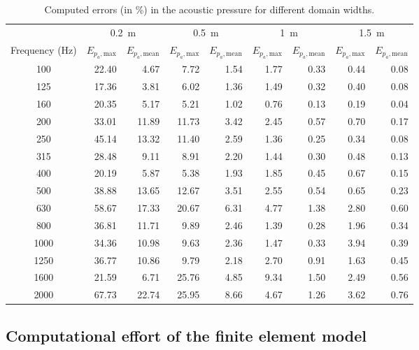 {\begin{table}
	\centering
	\caption{Computed errors (in \%) in the acoustic pressure for different domain widths.}
	\label{tab:computed_errors}
	\begin{tabular}{crrrrrrrr}
		\toprule
		 & \multicolumn{2}{c}{\SI{0.2}{\meter}} & \multicolumn{2}{c}{\SI{0.5}{\meter}} & \multicolumn{2}{c}{\SI{1}{\meter}} & \multicolumn{2}{c}{\SI{1.5}{\meter}} \\ \cmidrule(lr){2-3} \cmidrule(lr){4-5} \cmidrule(lr){6-7} \cmidrule(lr){8-9}
		 Frequency (Hz)& $E_{p_a,\text{max}}$  & $E_{p_a,\text{mean}}$ & $E_{p_a,\text{max}}$ & $E_{p_a,\text{mean}}$ & $E_{p_a,\text{max}}$ & $E_{p_a,\text{mean}}$ & $E_{p_a,\text{max}}$ & $E_{p_a,\text{mean}}$ \\
		 \midrule
		 100 & 22.40 & 4.67 & 7.72 & 1.54 & 1.77 & 0.33 & 0.44 & 0.08 \\ 
		 125 & 17.36 & 3.81 & 6.02 & 1.36 & 1.49 & 0.32 & 0.40 & 0.08 \\ 
		 160 & 20.35 & 5.17 & 5.21 & 1.02 & 0.76 & 0.13 & 0.19 & 0.04 \\ 
		 200 & 33.01 & 11.89 & 11.73 & 3.42 & 2.45 & 0.57 & 0.70 & 0.17 \\ 
		 250 & 45.14 & 13.32 & 11.40 & 2.59 & 1.36 & 0.25 & 0.34 & 0.08 \\ 
		 315 & 28.48 & 9.11 & 8.91 & 2.20 & 1.44 & 0.30 & 0.48 & 0.13 \\ 
		 400 & 20.19 & 5.87 & 5.38 & 1.93 & 1.85 & 0.45 & 0.67 & 0.15 \\ 
		 500 & 38.88 & 13.65 & 12.67 & 3.51 & 2.55 & 0.54 & 0.65 & 0.23 \\ 
		 630 & 58.67 & 17.33 & 20.67 & 6.31 & 4.77 & 1.38 & 2.80 & 0.60 \\ 
		 800 & 36.81 & 11.71 & 9.89 & 2.46 & 1.39 & 0.28 & 1.96 & 0.34 \\ 
		 1000 & 34.36 & 10.98 & 9.63 & 2.36 & 1.47 & 0.33 & 3.94 & 0.39 \\ 
		 1250 & 36.77 & 10.86 & 9.79 & 2.18 & 2.70 & 0.91 & 1.63 & 0.45 \\ 
		 1600 & 21.59 & 6.71 & 25.76 & 4.85 & 9.34 & 1.50 & 2.49 & 0.56 \\ 
		 2000 & 67.73 & 22.74 & 25.95 & 8.66 & 4.67 & 1.26 & 3.62 & 0.76 \\
		 \bottomrule		
	\end{tabular}
\end{table}


\newpage
\subsection*{Computational effort of the finite element model}

}
